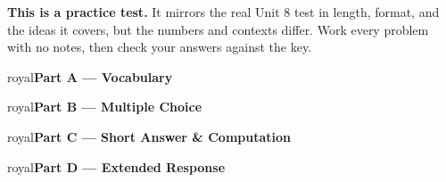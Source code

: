 \documentclass[10pt]{article}
\newcommand{\parthead}[1]{%
  \vspace{6pt}\noindent
  \begin{headlinebox}{royal}{\color{white}\bfseries #1}\end{headlinebox}%
  \vspace{4pt}}
\begin{document}
\namedateperiod

\vspace{0.10in}
\begin{remindbox}
\small
\textbf{This is a practice test.} It mirrors the real Unit 8 test in length, format,
and the ideas it covers, but the numbers and contexts differ. Work every problem
with no notes, then check your answers against the key.
\end{remindbox}

\parthead{Part A --- Vocabulary}

\parthead{Part B --- Multiple Choice}

\parthead{Part C --- Short Answer \& Computation}

\parthead{Part D --- Extended Response}
\end{document}
